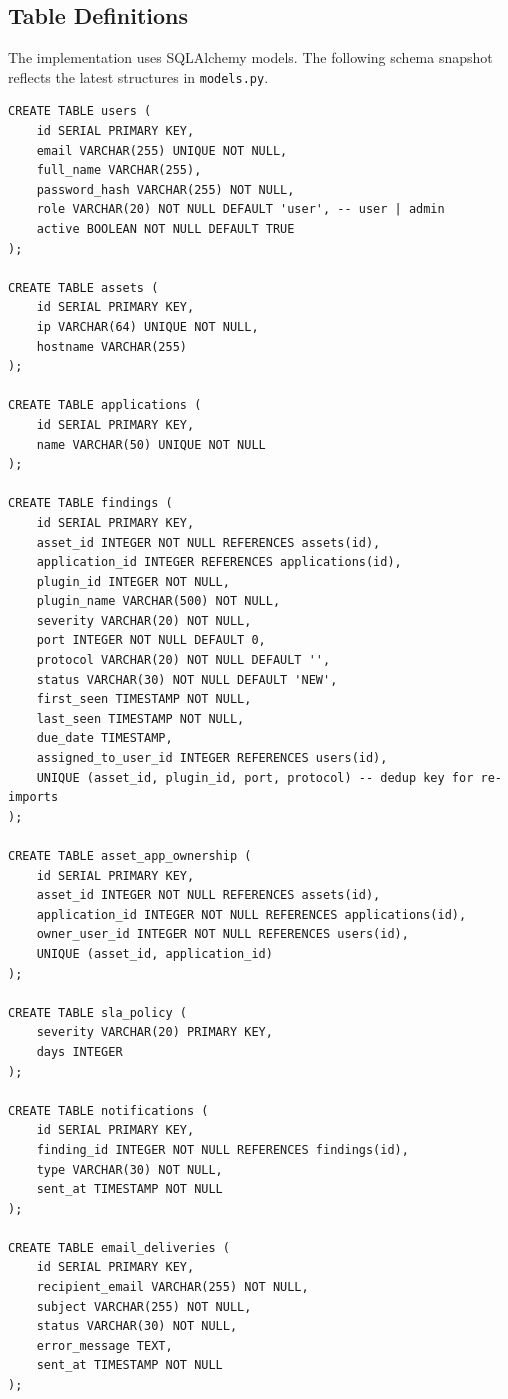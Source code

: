 \subsection{Table Definitions}

The implementation uses SQLAlchemy models. The following schema snapshot reflects the latest structures in \texttt{models.py}.

\begin{lstlisting}[style=sql, caption={Database schema aligned with implementation}, label={lst:schema-current}]
CREATE TABLE users (
    id SERIAL PRIMARY KEY,
    email VARCHAR(255) UNIQUE NOT NULL,
    full_name VARCHAR(255),
    password_hash VARCHAR(255) NOT NULL,
    role VARCHAR(20) NOT NULL DEFAULT 'user', -- user | admin
    active BOOLEAN NOT NULL DEFAULT TRUE
);

CREATE TABLE assets (
    id SERIAL PRIMARY KEY,
    ip VARCHAR(64) UNIQUE NOT NULL,
    hostname VARCHAR(255)
);

CREATE TABLE applications (
    id SERIAL PRIMARY KEY,
    name VARCHAR(50) UNIQUE NOT NULL
);

CREATE TABLE findings (
    id SERIAL PRIMARY KEY,
    asset_id INTEGER NOT NULL REFERENCES assets(id),
    application_id INTEGER REFERENCES applications(id),
    plugin_id INTEGER NOT NULL,
    plugin_name VARCHAR(500) NOT NULL,
    severity VARCHAR(20) NOT NULL,
    port INTEGER NOT NULL DEFAULT 0,
    protocol VARCHAR(20) NOT NULL DEFAULT '',
    status VARCHAR(30) NOT NULL DEFAULT 'NEW',
    first_seen TIMESTAMP NOT NULL,
    last_seen TIMESTAMP NOT NULL,
    due_date TIMESTAMP,
    assigned_to_user_id INTEGER REFERENCES users(id),
    UNIQUE (asset_id, plugin_id, port, protocol) -- dedup key for re-imports
);

CREATE TABLE asset_app_ownership (
    id SERIAL PRIMARY KEY,
    asset_id INTEGER NOT NULL REFERENCES assets(id),
    application_id INTEGER NOT NULL REFERENCES applications(id),
    owner_user_id INTEGER NOT NULL REFERENCES users(id),
    UNIQUE (asset_id, application_id)
);

CREATE TABLE sla_policy (
    severity VARCHAR(20) PRIMARY KEY,
    days INTEGER
);

CREATE TABLE notifications (
    id SERIAL PRIMARY KEY,
    finding_id INTEGER NOT NULL REFERENCES findings(id),
    type VARCHAR(30) NOT NULL,
    sent_at TIMESTAMP NOT NULL
);

CREATE TABLE email_deliveries (
    id SERIAL PRIMARY KEY,
    recipient_email VARCHAR(255) NOT NULL,
    subject VARCHAR(255) NOT NULL,
    status VARCHAR(30) NOT NULL,
    error_message TEXT,
    sent_at TIMESTAMP NOT NULL
);


\end{lstlisting}

